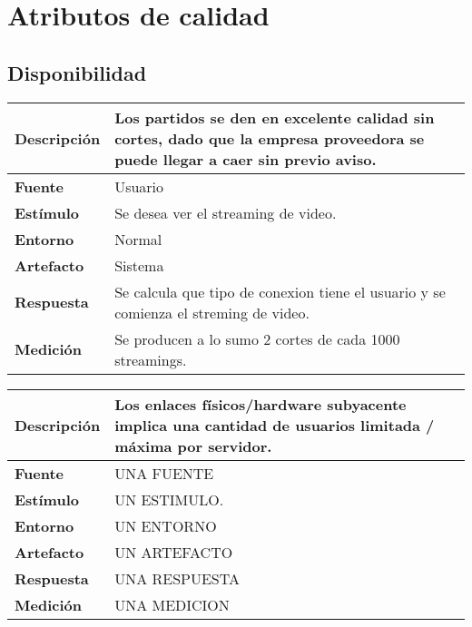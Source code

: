 \section{Atributos de calidad}
\subsection{Disponibilidad}

\begin{center}
  \begin{tabular}{| l | p{10cm} | }
    \hline
  \textbf{Descripción} & Los partidos se den en excelente calidad sin cortes, dado que la empresa proveedora se puede llegar a caer sin previo aviso.\\  \hline
  \textbf{Fuente} & Usuario\\  \hline
  \textbf{Estímulo} & Se desea ver el streaming de video.\\  \hline
  \textbf{Entorno} & Normal\\  \hline
  \textbf{Artefacto} & Sistema\\  \hline
  \textbf{Respuesta} & Se calcula que tipo de conexion tiene el usuario y se comienza el streming de video.\\  \hline
  \textbf{Medición} & Se producen a lo sumo 2 cortes de cada 1000 streamings.\\  \hline
  \end{tabular}
\end{center} 

\begin{center}
  \begin{tabular}{| l | p{10cm} | }
    \hline
  \textbf{Descripción} & Los enlaces físicos/hardware subyacente implica una cantidad de usuarios limitada / máxima por servidor.\\  \hline
  \textbf{Fuente} & UNA FUENTE\\  \hline
  \textbf{Estímulo} & UN ESTIMULO.\\  \hline
  \textbf{Entorno} & UN ENTORNO\\  \hline
  \textbf{Artefacto} & UN ARTEFACTO\\  \hline
  \textbf{Respuesta} & UNA RESPUESTA\\  \hline
  \textbf{Medición} & UNA MEDICION\\  \hline
  \end{tabular}
\end{center} 


